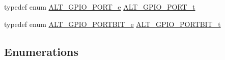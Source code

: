 \begin{DoxyCompactItemize}
\item 
typedef enum \mbox{\hyperlink{group__ALT__GPIO__API__CONFIG_ga15f94aa64366eb5fc5ed705322542d70}{A\+L\+T\+\_\+\+G\+P\+I\+O\+\_\+\+P\+O\+R\+T\+\_\+e}} \mbox{\hyperlink{group__ALT__GPIO__API__CONFIG_gaaf1cf0e2a720d20cd883810f2b59097e}{A\+L\+T\+\_\+\+G\+P\+I\+O\+\_\+\+P\+O\+R\+T\+\_\+t}}
\item 
typedef enum \mbox{\hyperlink{group__ALT__GPIO__API__CONFIG_ga655ce0b7b808aa71b821439fd82b9796}{A\+L\+T\+\_\+\+G\+P\+I\+O\+\_\+\+P\+O\+R\+T\+B\+I\+T\+\_\+e}} \mbox{\hyperlink{group__ALT__GPIO__API__CONFIG_gae4215fdba724cf1aa2ddefdcadabe622}{A\+L\+T\+\_\+\+G\+P\+I\+O\+\_\+\+P\+O\+R\+T\+B\+I\+T\+\_\+t}}
\end{DoxyCompactItemize}
\subsection*{Enumerations}
